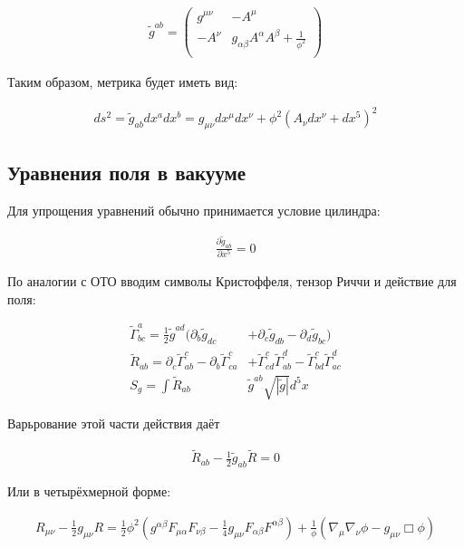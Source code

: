 \documentclass[a4paper,14pt]{article}
\begin{document}
	\begin{align*}
	 	\tilde g^{ab} =
		\left( \begin{array}{cc}
			g^{ \mu \nu } & - A^{\mu}                                                  \\
			- A^{ \nu }   &  g_{\alpha \beta} A^{\alpha} A^{\beta} + \frac{1}{\phi^2}  \\
		\end{array} \right)
	\end{align*}

	Таким образом, метрика будет иметь вид:

	\begin{align*}
	 	ds^2 = \tilde g_{ab} dx^a dx^b = g_{\mu \nu} dx^{\mu} dx^{\nu} + \phi^2 (A_{\nu} dx^{\nu} + dx^5)^2
	\end{align*}

\subsection*{Уравнения поля в вакууме}

	Для упрощения уравнений обычно принимается условие цилиндра:

	\begin{align*}
	 	\frac{ \partial \tilde g_{ab} }{\partial x^5} = 0
	\end{align*}

	По аналогии с ОТО вводим символы Кристоффеля, тензор Риччи и действие для поля:

	\begin{align*}
	 	\tilde{\Gamma}_{bc}^a= \frac{1}{2} \tilde g^{ad} ( \partial_b \tilde g_{dc}& + \partial_c \tilde g_{db} - \partial_d \tilde g_{bc}) \\
	 	\tilde{R}_{ab} = \partial_c \tilde{\Gamma}_{ab}^c - \partial_b \tilde{\Gamma}_{ca}^c & + \tilde{\Gamma}_{cd}^c \tilde{\Gamma}_{ab}^d - \tilde{\Gamma}_{bd}^c \tilde{\Gamma}_{ac}^d \\
	 	S_g = \int \tilde{R}_{ab} & \tilde{g}^{ab} \sqrt{ |\tilde{g}| } d^5 x
	\end{align*}

	Варьрование этой части действия даёт

	\begin{align*}
	 	\tilde{R}_{ab} - \frac{1}{2} \tilde g_{ab} \tilde R = 0
	\end{align*}

	Или в четырёхмерной форме:

	\begin{align*}
	 	{R}_{\mu \nu} - \frac{1}{2} g_{\mu \nu} R = \frac{1}{2} \phi^2 ( g^{\alpha \beta } F_{\mu \alpha} F_{\nu \beta} - \frac{1}{4} g_{\mu \nu} F_{\alpha \beta} F^{\alpha \beta} ) + \frac{1}{\phi}(\nabla_{\mu} \nabla_{\nu} \phi - g_{\mu \nu} \Box \phi)
	\end{align*}
\end{document}

